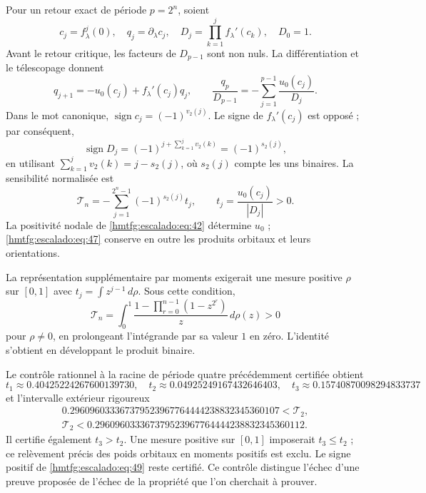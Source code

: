 Pour un retour exact de période \(p=2^n\), soient
\[
c_j=f_\lambda^j(0),\quad q_j=\partial_\lambda c_j,\quad
D_j=\prod_{k=1}^j f_\lambda'(c_k),\quad D_0=1.
\]
Avant le retour critique, les facteurs de \(D_{p-1}\) sont non nuls. La différentiation et le télescopage donnent
\begin{equation}
q_{j+1}=-u_0(c_j)+f_\lambda'(c_j)q_j,\qquad
\boxed{\frac{q_p}{D_{p-1}}
=-\sum_{j=1}^{p-1}\frac{u_0(c_j)}{D_j}.}
\label{hmtfg:escalado:eq:45}
\end{equation}
Dans le mot canonique, \(\operatorname{sign}c_j=(-1)^{v_2(j)}\). Le signe de \(f_\lambda'(c_j)\) est opposé ; par conséquent,
\begin{equation}
\operatorname{sign}D_j=(-1)^{j+\sum_{k=1}^jv_2(k)}
=(-1)^{s_2(j)},
\label{hmtfg:escalado:eq:46}
\end{equation}
en utilisant \(\sum_{k=1}^jv_2(k)=j-s_2(j)\), où \(s_2(j)\) compte les uns binaires. La sensibilité normalisée est
\begin{equation}
\mathcal T_n=-\sum_{j=1}^{2^n-1}(-1)^{s_2(j)}t_j,\qquad
t_j=\frac{u_0(c_j)}{|D_j|}>0.
\label{hmtfg:escalado:eq:47}
\end{equation}
La positivité nodale de \eqref{hmtfg:escalado:eq:42} détermine \(u_0\) ; \eqref{hmtfg:escalado:eq:47} conserve en outre les produits orbitaux et leurs orientations.

La représentation supplémentaire par moments exigerait une mesure positive \(\rho\) sur \([0,1]\) avec \(t_j=\int z^{j-1}\,d\rho\). Sous cette condition,
\begin{equation}
\mathcal T_n=\int_0^1
\frac{1-\prod_{r=0}^{n-1}(1-z^{2^r})}{z}\,d\rho(z)>0
\label{hmtfg:escalado:eq:48}
\end{equation}
pour \(\rho\ne0\), en prolongeant l’intégrande par sa valeur \(1\) en zéro. L’identité s’obtient en développant le produit binaire.

Le contrôle rationnel à la racine de période quatre précédemment certifiée obtient
\[
t_1\approx0.40425224267600139730,\quad
t_2\approx0.04925249167432646403,\quad
t_3\approx0.15740870098294833737
\]
et l’intervalle extérieur rigoureux
\begin{equation}
\begin{gathered}
0.296096033367379523967764444238832345360107<\mathcal T_2,\\
\mathcal T_2<0.296096033367379523967764444238832345360112.
\end{gathered}
\label{hmtfg:escalado:eq:49}
\end{equation}
Il certifie également \(t_3>t_2\). Une mesure positive sur \([0,1]\) imposerait \(t_3\le t_2\) ; ce relèvement précis des poids orbitaux en moments positifs est exclu. Le signe positif de \eqref{hmtfg:escalado:eq:49} reste certifié. Ce contrôle distingue l’échec d’une preuve proposée de l’échec de la propriété que l’on cherchait à prouver.
